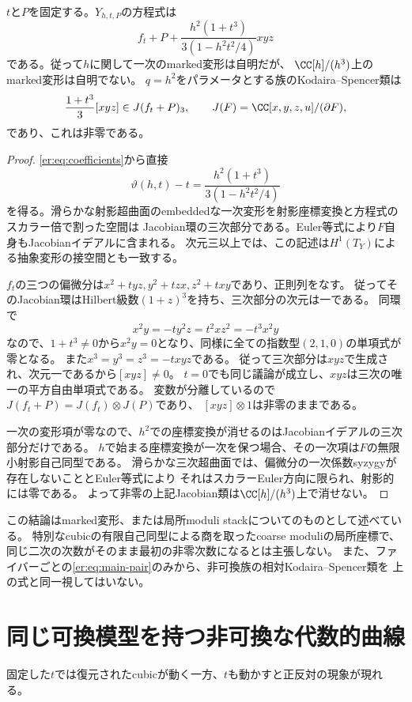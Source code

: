 \begin{theorem}[markedな二次変形の非自明性]\label{er:thm:second-order}
$t$と$P$を固定する。$Y_{h,t,P}$の方程式は
\begin{equation}\label{er:eq:second}
 f_t+P+\frac{h^2(1+t^3)}{3(1-h^2t^2/4)}xyz
\end{equation}
である。従って$h$に関して一次のmarked変形は自明だが、
$\CC[h]/(h^3)$上のmarked変形は自明でない。
$q=h^2$をパラメータとする族のKodaira--Spencer類は
\[
 \frac{1+t^3}{3}[xyz]\in
 J(f_t+P)_3,
 \qquad J(F)=\CC[x,y,z,u]/(\partial F),
\]
であり、これは非零である。
\end{theorem}
\begin{proof}
\eqref{er:eq:coefficients}から直接
\[
 \vartheta(h,t)-t=
 \frac{h^2(1+t^3)}{3(1-h^2t^2/4)}
\]
を得る。滑らかな射影超曲面のembeddedな一次変形を射影座標変換と方程式のスカラー倍で割った空間は
Jacobian環の三次部分である。Euler等式により$F$自身もJacobianイデアルに含まれる。
次元三以上では、この記述は$H^1(T_Y)$による抽象変形の接空間とも一致する。

$f_t$の三つの偏微分は$x^2+tyz,y^2+tzx,z^2+txy$であり、正則列をなす。
従ってそのJacobian環はHilbert級数$(1+z)^3$を持ち、三次部分の次元は一である。
同環で
\[
 x^2y=-t y^2z=t^2xz^2=-t^3x^2y
\]
なので、$1+t^3\ne0$から$x^2y=0$となり、同様に全ての指数型$(2,1,0)$の単項式が零となる。
また$x^3=y^3=z^3=-txyz$である。
従って三次部分は$xyz$で生成され、次元一であるから$[xyz]\ne0$。
$t=0$でも同じ議論が成立し、$xyz$は三次の唯一の平方自由単項式である。
変数が分離しているので$J(f_t+P)=J(f_t)\otimes J(P)$であり、
$[xyz]\otimes1$は非零のままである。

一次の変形項が零なので、$h^2$での座標変換が消せるのはJacobianイデアルの三次部分だけである。
$h$で始まる座標変換が一次を保つ場合、その一次項は$F$の無限小射影自己同型である。
滑らかな三次超曲面では、偏微分の一次係数syzygyが存在しないこととEuler等式により
それはスカラーEuler方向に限られ、射影的には零である。
よって非零の上記Jacobian類は$\CC[h]/(h^3)$上で消せない。
\end{proof}

\begin{remark}
この結論はmarked変形、または局所moduli stackについてのものとして述べている。
特別なcubicの有限自己同型による商を取ったcoarse moduliの局所座標で、
同じ二次の次数がそのまま最初の非零次数になるとは主張しない。
また、ファイバーごとの\eqref{er:eq:main-pair}のみから、非可換族の相対Kodaira--Spencer類を
上の式と同一視してはいない。
\end{remark}

\section{同じ可換模型を持つ非可換な代数的曲線}\label{er:sec:constant-model}
固定した$t$では復元されたcubicが動く一方、$t$も動かすと正反対の現象が現れる。

